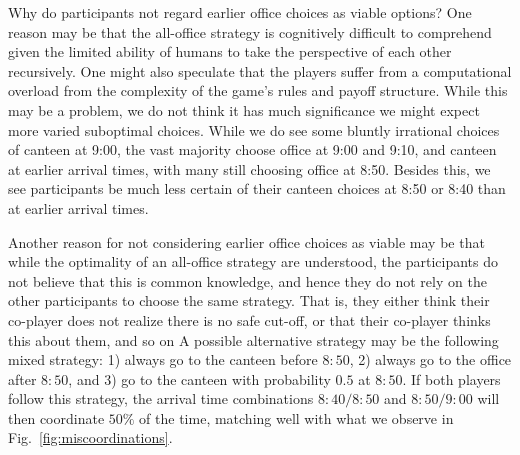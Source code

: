 Why do participants not regard earlier office choices as viable options? One reason may be that the all-office strategy is cognitively difficult to comprehend given the  limited  ability of humans to take the perspective of each other recursively. One might also speculate that the players suffer from a computational overload from the complexity of the game's rules and payoff structure. While this may be a problem, we do not think it has much significance we might expect more varied suboptimal choices. While we do see some bluntly irrational choices of canteen at 9:00, the vast majority choose office at 9:00 and 9:10, and canteen at earlier arrival times, with many still choosing office at 8:50. Besides this, we see participants be much less certain of their canteen choices at 8:50 or 8:40 than at earlier arrival times. 

Another reason for not considering earlier office choices as viable may be that while the optimality of an all-office strategy are understood, the participants do not believe that this is common knowledge, and hence they do not rely on the other participants to choose the same strategy. That is, they either think their co-player does not realize there is no safe cut-off, or that their co-player thinks this about them, and so on A possible alternative strategy may be the following mixed strategy: 1) always go to the canteen before $8{:}50$, 2) always go to the office after $8{:}50$, and 3) go to the canteen with probability $0.5$ at $8{:}50$. If both players follow this strategy, the arrival time combinations $8{:}40/8{:}50$ and $8{:}50/9{:}00$ will then coordinate $50\%$ of the time, matching well with what we observe in Fig.~\ref{fig:miscoordinations}. 

